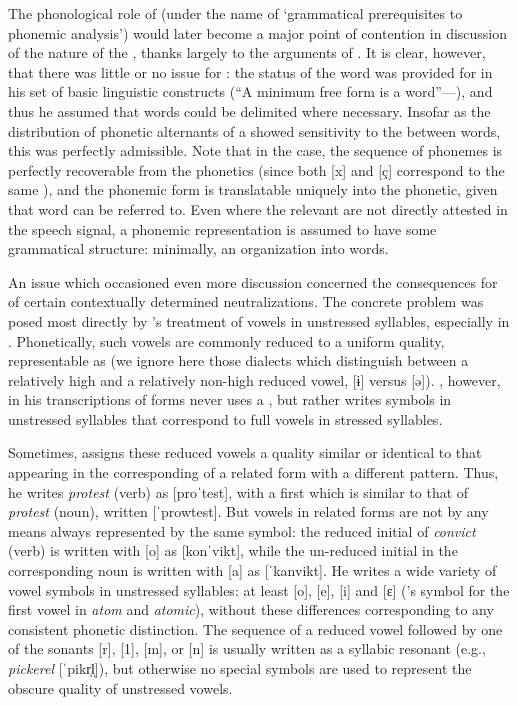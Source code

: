The phonological role of  (under the name of `grammatical
prerequisites to phonemic analysis') would later become a major point
of contention in discussion of the nature of the , thanks
largely to the arguments of \citet{pike47:gppa,pike52:mogp}. It is
clear, however, that there was little or no issue for {\Bloomfield}: the
status of the word was provided for in his set of basic linguistic
constructs (``A minimum free form is a
word''—), and thus he assumed
that words could be delimited where necessary. Insofar as the
distribution of phonetic alternants of a  showed sensitivity to
the  between words, this was perfectly admissible. Note that
in the  case, the sequence of phonemes is perfectly recoverable
from the phonetics (since both [x] and [ç] correspond to the same
), and the phonemic form is translatable uniquely into the
phonetic, given that word  can be referred to. Even where
the relevant  are not directly attested in the speech
signal, a phonemic representation is assumed to have some grammatical
structure: minimally, an organization into words.

An issue which occasioned even more discussion concerned the
consequences for  of certain contextually
determined neutralizations. The concrete problem was posed most
directly by {\Bloomfield}'s treatment of vowels in unstressed syllables,
especially in . Phonetically, such vowels are commonly reduced
to a uniform quality, representable as  (we ignore here those
dialects which distinguish between a relatively high and a relatively
non-high reduced vowel, [ɨ] versus [ə]). {\Bloomfield}, however, in his
transcriptions of  forms never uses a , but
rather writes symbols in unstressed syllables that correspond to full
vowels in stressed syllables.

Sometimes, {\Bloomfield} assigns these reduced vowels a quality similar
or identical to that appearing in the corresponding  of a
related form with a different  pattern. Thus, he writes
\emph{protest} (verb) as [proˈtest], with a first  which is
similar to that of \emph{protest} (noun), written [ˈprowtest]. But
vowels in related forms are not by any means always represented by the
same symbol: the reduced initial  of \emph{convict} (verb) is
written with [o] as [konˈvikt], while the un-reduced initial in the
corresponding noun is written with [a] as [ˈkanvikt]. He writes a wide
variety of vowel symbols in unstressed syllables: at least [o], [e],
[i] and [ɛ] ({\Bloomfield}'s symbol for the first vowel in \emph{atom}
and \emph{atomic}), without these differences corresponding to any
consistent phonetic distinction. The sequence of a reduced vowel
followed by one of the sonants [r], [1], [m], or [n] is usually
written as a syllabic resonant (e.g., \emph{pickerel} [ˈpikr̩l̩]), but otherwise
no special symbols are used to represent the obscure quality of
unstressed vowels.

